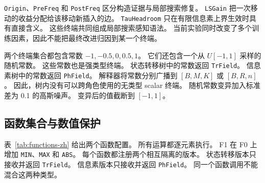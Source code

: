 \documentclass[letterpaper,journal]{IEEEtran}
\begin{document}
\texttt{Origin}、\texttt{PreFreq} 和 \texttt{PostFreq}
区分构造证据与局部搜索修复。
\texttt{LSGain} 把一次移动的收益分配给该移动新插入的边。
\texttt{TauHeadroom} 只在有限信息素上界生效时具有直接含义。
这些终端共同组成局部搜索感知语法。
当前实验同时改变了多个训练因素，因此不能把最终改进归因到某一个终端。

两个终端集合都包含常数 \(-1,-0.5,0,0.5,1\)。
它们还包含一个从 \(U[-1,1]\) 采样的随机常数。
这些常数也是强类型终端。
状态转移树中的常数返回 \texttt{TrField}。
信息素树中的常数返回 \texttt{PhField}。
解释器将常数分别广播到 \([B,M,K]\) 或 \([B,R,n]\)。
因此，树内没有可以跨角色使用的无类型 scalar 终端。
随机常数变异加入标准差为 0.1 的高斯噪声。
变异后的值截断到 \([-1,1]\)。

\subsection{函数集合与数值保护}

表~\ref{tab:functions-zh} 给出两个函数配置。
所有运算都逐元素执行。
F1 在 F0 上增加 \texttt{MIN}、\texttt{MAX} 和 \texttt{ABS}。
每个函数都注册两个相互隔离的版本。
状态转移版本只接收并返回 \texttt{TrField}。
信息素版本只接收并返回 \texttt{PhField}。
同一个函数调用不能混合这两种类型。
\end{document}
